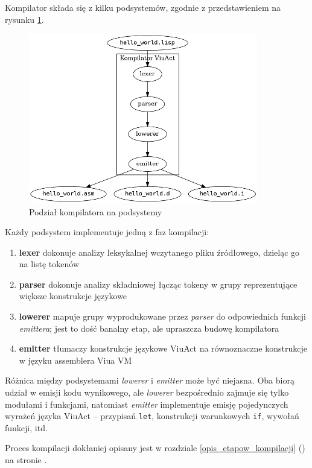 \documentclass[11pt,oneside,a4paper,titlepage,onecolumn]{article}
\begin{document}
Kompilator składa się z kilku podsystemów, zgodnie z
przedstawieniem na rysunku \ref{ogolny_schemat_kompilatora_viuact}.

\begin{figure}[!htp]
    \centering
    \includegraphics[width=10cm]{viuact-ogolny-schemat-kompilatora}
    \caption{Podział kompilatora na podsystemy}
    \label{ogolny_schemat_kompilatora_viuact}
\end{figure}

Każdy podsystem implementuje jedną z faz kompilacji:

\begin{enumerate}
    \item \textbf{lexer} dokonuje analizy leksykalnej wczytanego pliku źródłowego, dzieląc go na listę tokenów
    \item \textbf{parser} dokonuje analizy składniowej łącząc tokeny w grupy reprezentujące większe
        konstrukcje językowe
    \item \textbf{lowerer} mapuje grupy wyprodukowane przez \emph{parser} do odpowiednich funkcji
        \emph{emittera}; jest to dość banalny etap, ale upraszcza budowę kompilatora
    \item \textbf{emitter} tłumaczy konstrukcje językowe ViuAct na równoznaczne konstrukcje w języku
        assemblera Viua VM
\end{enumerate}

Różnica między podsystemami \emph{lowerer} i \emph{emitter} może być niejasna. Oba biorą udział w emisji
kodu wynikowego, ale \emph{lowerer} bezpośrednio zajmuje się tylko modułami i funkcjami, natomiast
\emph{emitter} implementuje emisję pojedynczych wyrażeń języka ViuAct -- przypisań \texttt{let}, konstrukcji
warunkowych \texttt{if}, wywołań funkcji, itd.

Proces kompilacji dokłaniej opisany jest w rozdziale \ref{opis_etapow_kompilacji}
() na stronie \pageref{opis_etapow_kompilacji}.
\end{document}
